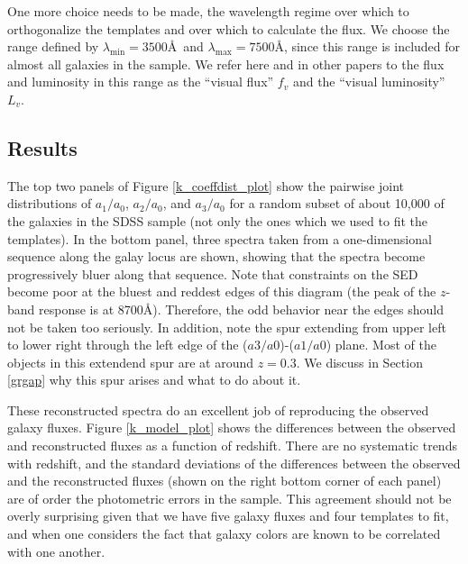 \documentclass[10pt,preprint]{aastex}
\begin{document}
One more choice needs to be made, the wavelength regime over which to
orthogonalize the templates and over which to calculate the flux. We
choose the range defined by $\lambda_{\mathrm{min}}=3500$\AA\ and
$\lambda_{\mathrm{max}}=7500$\AA, since this range is included for
almost all galaxies in the sample. We refer here and in other papers
to the flux and luminosity in this range as the ``visual flux'' $f_v$
and the ``visual luminosity'' $L_v$.

\subsection{Results}

The top two panels of Figure \ref{k_coeffdist_plot} show the pairwise
joint distributions of $a_1/a_0$, $a_2/a_0$, and $a_3/a_0$ for a
random subset of about 10,000 of the galaxies in the SDSS sample (not
only the ones which we used to fit the templates). In the bottom
panel, three spectra taken from a one-dimensional sequence along the
galay locus are shown, showing that the spectra become progressively
bluer along that sequence. Note that constraints on the SED become
poor at the bluest and reddest edges of this diagram (the peak of the
$z$-band response is at 8700\AA). Therefore, the odd behavior near the
edges should not be taken too seriously. In addition, note the spur
extending from upper left to lower right through the left edge of the
($a3/a0$)-($a1/a0$) plane. Most of the objects in this extendend spur
are at around $z=0.3$. We discuss in Section \ref{grgap} why this spur
arises and what to do about it. 

These reconstructed spectra do an excellent job of reproducing the
observed galaxy fluxes. Figure \ref{k_model_plot} shows the
differences between the observed and reconstructed fluxes as a
function of redshift. There are no systematic trends with redshift,
and the standard deviations of the differences between the observed
and the reconstructed fluxes (shown on the right bottom corner of each
panel) are of order the photometric errors in the sample. This
agreement should not be overly surprising given that we have five
galaxy fluxes and four templates to fit, and when one considers the
fact that galaxy colors are known to be correlated with one another.
\end{document}
